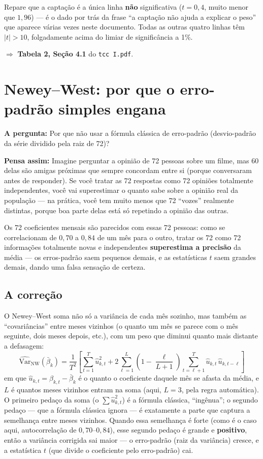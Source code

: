 \documentclass[11pt,a4paper]{article}
\newcommand{\pergunta}[1]{\par\vspace{4pt}\noindent\textbf{\color{azul}A pergunta:} #1\par\vspace{2pt}}
\newcommand{\analogia}[1]{\par\vspace{4pt}\noindent\textbf{\color{verde}Pensa assim:} #1\par\vspace{2pt}}
\begin{document}
Repare que a captação é a única linha \textbf{não} significativa ($t=0{,}4$, muito menor que
$1{,}96$) --- é o dado por trás da frase ``a captação não ajuda a explicar o peso'' que aparece
várias vezes neste documento. Todas as outras quatro linhas têm $|t|>10$, folgadamente acima do
limiar de significância a 1\%.

$\Rightarrow$ \textbf{Tabela 2, Seção 4.1} do \texttt{tcc I.pdf}.

\section{Newey--West: por que o erro-padrão simples engana}
\label{sec:nw}

\pergunta{Por que não usar a fórmula clássica de erro-padrão (desvio-padrão da série dividido
pela raiz de 72)?}

\analogia{Imagine perguntar a opinião de 72 pessoas sobre um filme, mas 60 delas são amigas
próximas que sempre concordam entre si (porque conversaram antes de responder). Se você tratar
as 72 respostas como 72 opiniões totalmente independentes, você vai superestimar o quanto sabe
sobre a opinião real da população --- na prática, você tem muito menos que 72 ``vozes''
realmente distintas, porque boa parte delas está só repetindo a opinião das outras.}

Os 72 coeficientes mensais são parecidos com essas 72 pessoas: como se correlacionam de $0{,}70$
a $0{,}84$ de um mês para o outro, tratar os 72 como 72 informações totalmente novas e
independentes \textbf{superestima a precisão} da média --- os erros-padrão saem pequenos demais,
e as estatísticas $t$ saem grandes demais, dando uma falsa sensação de certeza.

\subsection{A correção}

O Newey--West soma não só a variância de cada mês sozinho, mas também as ``covariâncias'' entre
meses vizinhos (o quanto um mês se parece com o mês seguinte, dois meses depois, etc.), com um
peso que diminui quanto mais distante a defasagem:
$$\widehat{\mathrm{Var}}_{\text{NW}}(\bar{\beta}_k) = \frac{1}{T^{2}}\left[
\sum_{t=1}^{T}\widehat{u}_{k,t}^{2}
+ 2\sum_{\ell=1}^{L}\left(1-\frac{\ell}{L+1}\right)\sum_{t=\ell+1}^{T}\widehat{u}_{k,t}\,\widehat{u}_{k,t-\ell}
\right]$$
em que $\widehat u_{k,t}=\beta_{k,t}-\bar\beta_k$ é o quanto o coeficiente daquele mês se afasta
da média, e $L$ é quantos meses vizinhos entram na soma (aqui, $L=3$, pela regra automática). O
primeiro pedaço da soma (o $\sum \widehat u_{k,t}^2$) é a fórmula clássica, ``ingênua''; o segundo
pedaço --- que a fórmula clássica ignora --- é exatamente a parte que captura a semelhança entre
meses vizinhos. Quando essa semelhança é forte (como é o caso aqui, autocorrelação de
$0{,}70$--$0{,}84$), esse segundo pedaço é grande e \textbf{positivo}, então a variância
corrigida sai maior --- o erro-padrão (raiz da variância) cresce, e a estatística $t$ (que divide
o coeficiente pelo erro-padrão) cai.
\end{document}
